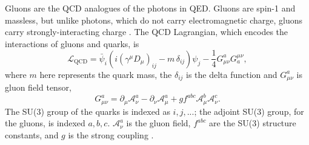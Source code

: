 Gluons are the QCD analogues of the photons in QED. Gluons are spin-1 and massless, but unlike photons, which do not carry electromagnetic charge, gluons carry strongly-interacting charge \cite{Wilczek:2000ih}. The QCD Lagrangian, which encodes the interactions of gluons and quarks, is
\begin{equation}
{\mathcal {L}}_{\mathrm {QCD} }={\bar {\psi }}_{i}\left(i(\gamma ^{\mu }D_{\mu })_{ij}-m\,\delta _{ij}\right)\psi _{j}-{\frac {1}{4}}G_{\mu \nu }^{a}G_{a}^{\mu \nu },
\end{equation}
where $m$ here represents the quark mass, the $\delta_{ij}$ is the delta function and $G_{\mu \nu }^{a}$ is gluon field tensor,  
\begin{equation}
\displaystyle G_{\mu \nu }^{a}=\partial _{\mu }{\mathcal {A}}_{\nu }^{a}-\partial _{\nu }{\mathcal {A}}_{\mu }^{a}+gf^{abc}{\mathcal {A}}_{\mu }^{b}{\mathcal {A}}_{\nu }^{c}.
\end{equation}
The SU(3) group of the quarks is indexed as $i,j,...$; the adjoint SU(3) group, for the gluons, is indexed $a,b,c$. ${\mathcal {A}}_{\nu }^{a}$ is the gluon field, $f^{abc}$ are the SU(3) structure constants, and $g$ is the strong coupling \cite{Schafer:2005ff}. 

